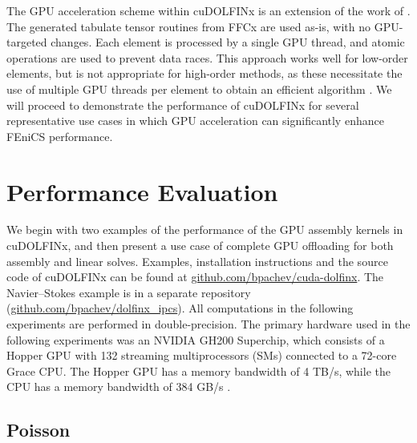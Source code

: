 The GPU acceleration scheme within cuDOLFINx is an extension of the work of \cite{trotter2023targeting}. The generated tabulate tensor routines from FFCx are used as-is, with no GPU-targeted changes. Each element is processed by a single GPU thread, and atomic operations are used to prevent data races. This approach works well for low-order elements, but is not appropriate for high-order methods, as these necessitate the use of multiple GPU threads per element to obtain an efficient algorithm \citep{MACIOL20101093,dziekonski2013generation,abdelfattah2021gpu, swirydowicz2019acceleration}. We will proceed to demonstrate the performance of cuDOLFINx for several representative use cases in which GPU acceleration can significantly enhance FEniCS performance.

\section*{Performance Evaluation}

We begin with two examples of the performance of the GPU assembly kernels in cuDOLFINx, and then present a use case of complete GPU offloading for both assembly and linear solves. Examples, installation instructions and the source code of cuDOLFINx can be found at \href{https://github.com/bpachev/cuda-dolfinx}{github.com/bpachev/cuda-dolfinx}. The Navier--Stokes example is in a separate repository (\href{https://github.com/bpachev/dolfinx\_ipcs}{github.com/bpachev/dolfinx\_ipcs}). All computations in the following experiments are performed in double-precision. The primary hardware used in the following experiments was an NVIDIA GH200 Superchip, which consists of a Hopper GPU with 132 streaming multiprocessors (SMs) connected to a 72-core Grace CPU. The Hopper GPU has a memory bandwidth of 4 TB/s, while the CPU has a memory bandwidth of 384 GB/s \citep{gh200specs}. 

\subsection*{Poisson}


